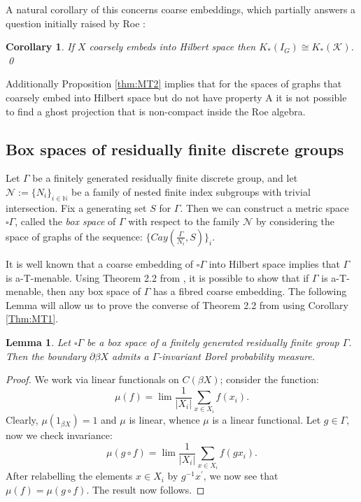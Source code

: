 \documentclass[preprint]{elsarticle}
\theoremstyle{plain}
\newtheorem{lemma}[theorem]{Lemma}%
\newtheorem{corollary}[theorem]{Corollary}%
\theoremstyle{definition}%
\theoremstyle{remark}%
\begin{document}
A natural corollary of this concerns coarse embeddings, which partially answers a question initially raised by Roe \cite[Chapter 11]{MR2007488}:

\begin{corollary}\label{thm:IT3}
If $X$ coarsely embeds into Hilbert space then $K_{*}(I_{G}) \cong K_{*}(\mathcal{K})$. \qed
\end{corollary}

Additionally Proposition \ref{thm:MT2} implies that for the spaces of graphs that coarsely embed into Hilbert space but do not have property A \cite{MR2899681,MR2920843} it is not possible to find a ghost projection that is non-compact inside the Roe algebra. 

\subsection{Box spaces of residually finite discrete groups}
Let $\Gamma$ be a finitely generated residually finite discrete group, and let $\mathcal{N}:=\lbrace N_{i} \rbrace_{i\in\mathbb{N}}$ be a family of nested finite index subgroups with trivial intersection. Fix a generating set $S$ for $\Gamma$. Then we can construct a metric space $\square \Gamma$, called the \textit{box space} of $\Gamma$ with respect to the family $\mathcal{N}$ by considering the space of graphs of the sequence: $\lbrace Cay(\frac{\Gamma}{N_{i}},S) \rbrace_{i}$. 

It is well known \cite[Proposition 11.26]{MR2007488} that a coarse embedding of $\square \Gamma$ into Hilbert space implies that $\Gamma$ is a-T-menable. Using Theorem 2.2 from \cite{FCEpaper}, it is possible to show that if $\Gamma$ is a-T-menable, then any box space of $\Gamma$ has a fibred coarse embedding. The following Lemma will allow us to prove the converse of Theorem 2.2 from \cite{FCEpaper} using Corollary \ref{Thm:MT1}.

\begin{lemma}\label{lem:cor2}
Let $\square \Gamma$ be a box space of a finitely generated residually finite group $\Gamma$. Then the boundary $\partial\beta X$ admits a $\Gamma$-invariant Borel probability measure.
\end{lemma}
\begin{proof}
We work via linear functionals on $C(\beta X)$; consider the function:
\begin{equation*}
\mu(f)=\lim \frac{1}{\vert X_{i} \vert}\sum_{x \in X_{i}}f(x_{i}).
\end{equation*}
Clearly, $\mu(1_{\beta X})=1$ and $\mu$ is linear, whence $\mu$ is a linear functional. Let $g \in \Gamma$, now we check invariance:
\begin{equation*}
\mu(g\circ f)=\lim \frac{1}{\vert X_{i} \vert}\sum_{x \in X_{i}}f(gx_{i}).
\end{equation*}
After relabelling the elements $x \in X_{i}$ by $g^{-1}x^{'}$, we now see that $\mu(f)=\mu(g \circ f)$. The result now follows.
\end{proof}
\end{document}
